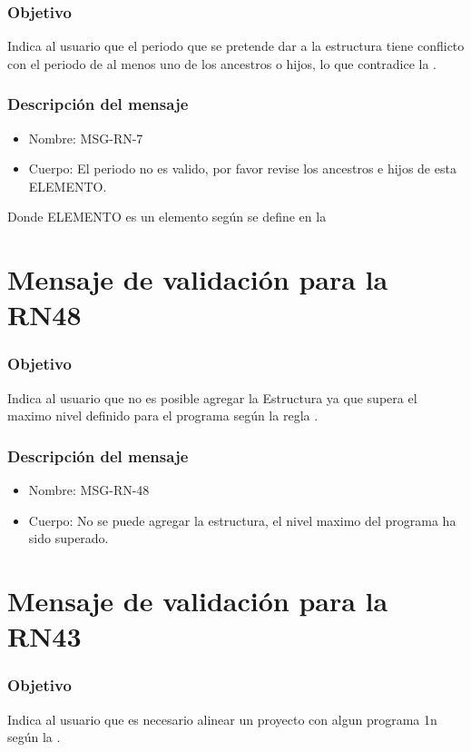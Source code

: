 \subsubsection{Objetivo}
Indica al usuario que el periodo que se pretende dar a la estructura tiene conflicto con el periodo de al menos uno de los ancestros o hijos, lo que contradice la .

\subsubsection{Descripción del mensaje}
\begin{itemize}
\item Nombre: MSG-RN-7
\item Cuerpo: El periodo no es valido, por favor revise los ancestros e hijos de esta ELEMENTO.
\end{itemize}
Donde ELEMENTO es un elemento según se define en la 

\section{Mensaje de validación para la RN48} \label{MSG_RN48}

\subsubsection{Objetivo}
Indica al usuario que no es posible agregar la Estructura ya que supera el maximo nivel definido para el programa según la regla .

\subsubsection{Descripción del mensaje}
\begin{itemize}
\item Nombre: MSG-RN-48
\item Cuerpo: No se puede agregar la estructura, el nivel maximo del programa ha sido superado.
\end{itemize}

\section{Mensaje de validación para la RN43} \label{MSG_RN43}

\subsubsection{Objetivo}
Indica al usuario que es necesario alinear un proyecto con algun programa 1n según la .

